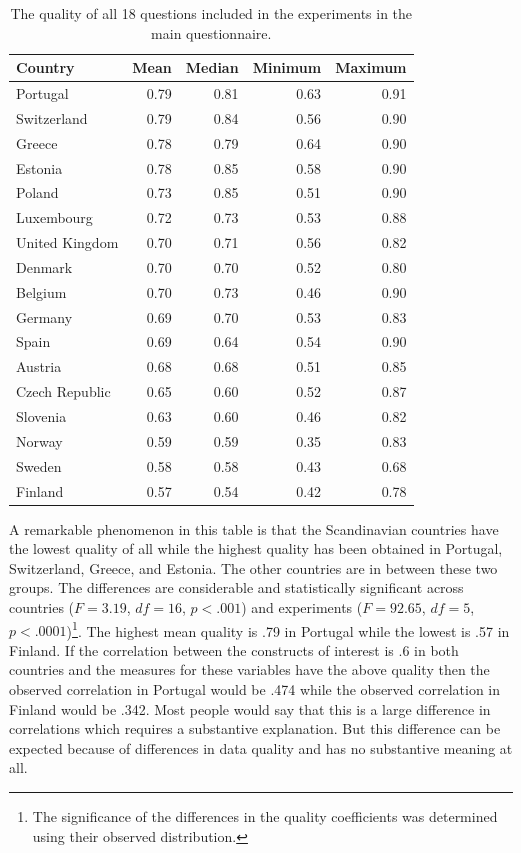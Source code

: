 \documentclass[a4paper,12pt]{article}
\begin{document}
\begin{table}[hbt]\centering\caption{The quality of all 18 questions included in the experiments in the main questionnaire.\label{tab:countries}}
\begin{tabular}{lrrrr}
\hline
Country&Mean&Median&Minimum&Maximum\\\hline
Portugal&0.79&0.81&0.63&0.91\\
Switzerland&0.79&0.84&0.56&0.90\\
Greece&0.78&0.79&0.64&0.90\\
Estonia&0.78&0.85&0.58&0.90\\
Poland&0.73&0.85&0.51&0.90\\
Luxembourg&0.72&0.73&0.53&0.88\\
United Kingdom&0.70&0.71&0.56&0.82\\
Denmark&0.70&0.70&0.52&0.80\\
Belgium&0.70&0.73&0.46&0.90\\
Germany&0.69&0.70&0.53&0.83\\
Spain&0.69&0.64&0.54&0.90\\
Austria&0.68&0.68&0.51&0.85\\
Czech Republic&0.65&0.60&0.52&0.87\\
Slovenia&0.63&0.60&0.46&0.82\\
Norway&0.59&0.59&0.35&0.83\\
Sweden&0.58&0.58&0.43&0.68\\
Finland&0.57&0.54&0.42&0.78\\
	\hline
\end{tabular}
\end{table}

A remarkable phenomenon in this table is that the Scandinavian countries have the lowest quality of all while the highest quality has been obtained in Portugal, Switzerland, Greece, and Estonia. The other countries are in between these two groups. 
The differences are considerable and statistically significant across countries ($F=3.19$, $df=16$, $p<.001$) and experiments ($F=92.65$, $df=5$, $p<.0001$)\footnote{The significance of the differences in the quality coefficients was determined using their observed distribution.}. The highest mean quality is .79 in Portugal while the lowest is .57 in Finland. If the correlation between the constructs of interest is .6 in both countries and the measures for these variables have the above quality then the observed correlation in Portugal would be .474 while the observed correlation in Finland would be .342. Most people would say that this is a large difference in correlations which requires a substantive explanation. But this difference can be expected because of differences in data quality and has no substantive meaning at all.
\end{document}
